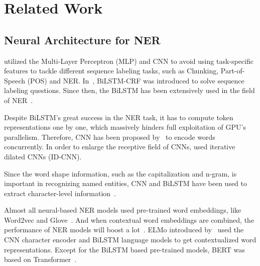 \documentclass[11pt,a4paper]{article}
\begin{document}
\section{Related Work}

\subsection{Neural Architecture for NER}

\citet{collobert2011natural} utilized the Multi-Layer Perceptron (MLP) and CNN to avoid using task-specific features to tackle different sequence labeling tasks, such as Chunking, Part-of-Speech (POS) and NER. In~\cite{huang2015bidirectional}, BiLSTM-CRF was introduced to solve sequence labeling questions. Since then, the BiLSTM has been extensively used in the field of NER~\cite{DBLP:journals/tacl/ChiuN16,DBLP:conf/nlpcc/DongZZHD16,DBLP:conf/nlpcc/YangZLZZS18,ma2016end}.



Despite BiLSTM's great success in the NER task, it has to compute token representations one by one, which massively hinders full exploitation of GPU's parallelism. Therefore, CNN has been proposed by~\cite{strubell2017fast,DBLP:conf/ijcai/GuiM0ZJH19} to encode words concurrently. In order to enlarge the receptive field of CNNs, \citep{strubell2017fast} used iterative dilated CNNs (ID-CNN).










Since the word shape information, such as the capitalization and n-gram, is important in recognizing named entities, CNN and BiLSTM have been used to extract character-level information~\cite{DBLP:journals/tacl/ChiuN16,lample2016neural,ma2016end,strubell2017fast,chen2019grn}. 



Almost all neural-based NER models used pre-trained word embeddings, like Word2vec and Glove~\cite{pennington2014glove,mikolov2013efficient}. And when contextual word embeddings are combined, the performance of NER models will boost a lot~\cite{DBLP:conf/acl/PetersABP17,peters2018deep,DBLP:conf/coling/AkbikBV18}. ELMo introduced by~\cite{peters2018deep} used the CNN character encoder and BiLSTM language models to get contextualized word representations. Except for the BiLSTM based pre-trained models, BERT was based on Transformer~\cite{DBLP:journals/corr/abs-1810-04805}.
\end{document}
